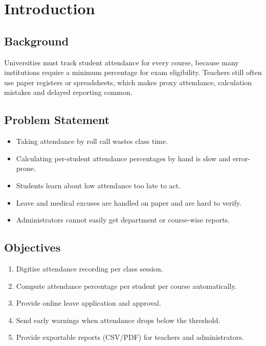 \documentclass[11pt,a4paper]{article}
\begin{document}
\tableofcontents
\newpage

\section{Introduction}
\subsection{Background}
Universities must track student attendance for every course, because many institutions require a
minimum percentage for exam eligibility. Teachers still often use paper registers or spreadsheets,
which makes proxy attendance, calculation mistakes and delayed reporting common.

\subsection{Problem Statement}
\begin{itemize}[noitemsep]
  \item Taking attendance by roll call wastes class time.
  \item Calculating per-student attendance percentages by hand is slow and error-prone.
  \item Students learn about low attendance too late to act.
  \item Leave and medical excuses are handled on paper and are hard to verify.
  \item Administrators cannot easily get department or course-wise reports.
\end{itemize}

\subsection{Objectives}
\begin{enumerate}[noitemsep]
  \item Digitise attendance recording per class session.
  \item Compute attendance percentage per student per course automatically.
  \item Provide online leave application and approval.
  \item Send early warnings when attendance drops below the threshold.
  \item Provide exportable reports (CSV/PDF) for teachers and administrators.
\end{enumerate}
\end{document}
